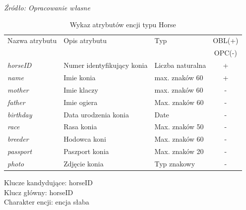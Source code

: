 \documentclass[12pt,oneside]{report}
\begin{document}
\begin{enumerate}[start=1,label={\bfseries ENC\textbackslash0\arabic*}]
	\begin{table}[H]
		\caption{Wykaz atrybutów encji typu Horse }
		\textit{Źródło: Opracowanie własne}
		\label{HorseAtribute}
		\centering
		\begin{tabular}{|l|l|l|c|}
			\hline
			Nazwa atrybutu & Opis atrybutu & Typ & OBL(+) \\
			& & &  OPC(-) \\
			\hline
			\textit{horseID} & Numer identyfikujący konia & Liczba naturalna & + \\
			\hline
			\textit{name} &  Imie konia & max. znaków 60 & + \\
			\hline
			\textit{mother} &  Imie klaczy & max. znaków 60 & - \\
			\hline
			\textit{father} &  Imie ogiera & Max. znaków 60 & - \\
			\hline
			\textit{birthday} & Data urodzenia konia & Date & - \\
			\hline
			\textit{race} &  Rasa konia & Max. znaków 50 & - \\
			\hline
			\textit{breeder} &  Hodowca koni & Max. znaków 60 & - \\
			\hline
			\textit{passport} & Paszport konia & Max. znaków 20 & - \\
			\hline
			\textit{photo} & Zdjęcie konia & Typ znakowy & - \\
			\hline
		\end{tabular}
	\end{table}
	Klucze kandydujące: horseID \\
	Klucz główny: horseID \\
	Charakter encji: encja słaba
\end{enumerate}
\end{document}
